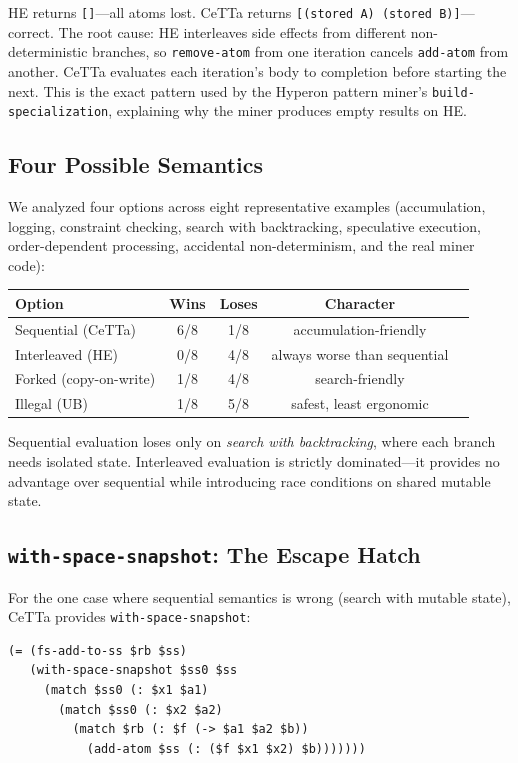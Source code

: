\documentclass[11pt]{article}
\newcommand{\code}[1]{\texttt{#1}}
\newcommand{\HE}{\textup{HE}}
\newcommand{\CeTTa}{\textup{CeTTa}}
\begin{document}
\HE{} returns \code{[]}---all atoms lost.  \CeTTa{} returns
\code{[(stored~A)~(stored~B)]}---correct.  The root cause:
\HE{} interleaves side effects from different non-deterministic
branches, so \code{remove-atom} from one iteration cancels
\code{add-atom} from another.  \CeTTa{} evaluates each iteration's
body to completion before starting the next.  This is the exact
pattern used by the Hyperon pattern miner's
\code{build-specialization}, explaining why the miner produces
empty results on \HE{}.

\subsection{Four Possible Semantics}

We analyzed four options across eight representative examples
(accumulation, logging, constraint checking, search with
backtracking, speculative execution, order-dependent processing,
accidental non-determinism, and the real miner code):

\begin{center}
\begin{tabular}{lcccc}
\toprule
Option & Wins & Loses & Character \\
\midrule
Sequential (CeTTa)  & 6/8 & 1/8 & accumulation-friendly \\
Interleaved (HE)    & 0/8 & 4/8 & always worse than sequential \\
Forked (copy-on-write) & 1/8 & 4/8 & search-friendly \\
Illegal (UB)        & 1/8 & 5/8 & safest, least ergonomic \\
\bottomrule
\end{tabular}
\end{center}

Sequential evaluation loses only on \emph{search with backtracking},
where each branch needs isolated state.  Interleaved evaluation
is strictly dominated---it provides no advantage over sequential
while introducing race conditions on shared mutable state.

\subsection{\code{with-space-snapshot}: The Escape Hatch}

For the one case where sequential semantics is wrong (search with
mutable state), \CeTTa{} provides \code{with-space-snapshot}:
\begin{lstlisting}[language={},basicstyle=\ttfamily\scriptsize]
(= (fs-add-to-ss $rb $ss)
   (with-space-snapshot $ss0 $ss
     (match $ss0 (: $x1 $a1)
       (match $ss0 (: $x2 $a2)
         (match $rb (: $f (-> $a1 $a2 $b))
           (add-atom $ss (: ($f $x1 $x2) $b)))))))
\end{lstlisting}
\end{document}
